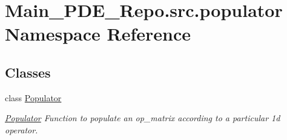 \hypertarget{namespaceMain__PDE__Repo_1_1src_1_1populator}{}\section{Main\+\_\+\+P\+D\+E\+\_\+\+Repo.\+src.\+populator Namespace Reference}
\label{namespaceMain__PDE__Repo_1_1src_1_1populator}
\subsection*{Classes}
\begin{DoxyCompactItemize}
\item 
class \hyperlink{classMain__PDE__Repo_1_1src_1_1populator_1_1Populator}{Populator}
\begin{DoxyCompactList}\small\item\em \hyperlink{classMain__PDE__Repo_1_1src_1_1populator_1_1Populator}{Populator} Function to populate an op\+\_\+matrix according to a particular 1d operator. \end{DoxyCompactList}\end{DoxyCompactItemize}
